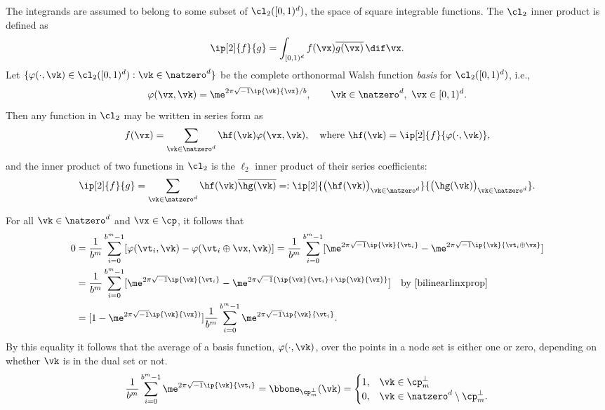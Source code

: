 \documentclass[]{elsarticle}
\theoremstyle{definition}
\newcommand{\cube}{[0,1)^d}
\renewcommand{\bbK}{\natzero^d}
\begin{document}
The integrands are assumed to belong to some subset of $\cl_2(\cube)$, the space of square integrable functions.  The $\cl_2$ inner product is defined as 
\[
\ip[2]{f}{g} = \int_{\cube} f(\vx) \overline{g(\vx)} \, \dif \vx.
\]
Let $\{\varphi(\cdot,\vk) \in \cl_2(\cube) : \vk \in \bbK\}$ be the complete orthonormal Walsh function \emph{basis} for $\cl_2(\cube)$, i.e., 
\[
\varphi(\vx,\vk)  = \me^{2 \pi \sqrt{-1} \ip{\vk}{\vx}/b}, \qquad \vk \in \bbK, \ \vx \in \cube.
\]
Then any function in $\cl_2$ may be written in series form as
\begin{equation} \label{Fourierdef}
f(\vx) = \sum_{\vk \in \bbK} \hf(\vk) \varphi(\vx,\vk), \quad \text{where } \hf(\vk) = \ip[2]{f}{\varphi(\cdot,\vk)},
\end{equation}
and the inner product of two functions in $\cl_2$ is the $\ell_2$ inner product of their series coefficients:
\[
\ip[2]{f}{g} = \sum_{\vk \in \bbK} \hf(\vk)\overline{\hg(\vk)} =: \ip[2]{\bigl(\hf(\vk)\bigr)_{\vk \in \bbK}}{\bigl ( \hg(\vk)\bigr )_{\vk \in \bbK}}.
\]

For all $\vk \in \bbK$ and $\vx \in \cp$, it follows that
\begin{align*} 
\nonumber
0 & = \frac{1}{b^m} \sum_{i=0}^{b^m-1} [\varphi(\vt_i,\vk) - \varphi(\vt_i \oplus \vx,\vk)]  
= \frac{1}{b^m} \sum_{i=0}^{b^m-1} [\me^{2 \pi \sqrt{-1} \ip{\vk}{\vt_i}} - \me^{2 \pi \sqrt{-1} \ip{\vk}{\vt_i \oplus \vx}}]\\
\nonumber
& = \frac{1}{b^m} \sum_{i=0}^{b^m-1} [\me^{2 \pi \sqrt{-1} \ip{\vk}{\vt_i}} - \me^{2 \pi \sqrt{-1} \{\ip{\vk}{\vt_i}+\ip{\vk}{\vx}\}}] \quad \text{by } \eqref{bilinearlinxprop}\\
\label{sumeq}
& = [1 - \me^{2 \pi \sqrt{-1} \ip{\vk}{\vx})}] \frac{1}{b^m} \sum_{i=0}^{b^m-1}  \me^{2 \pi \sqrt{-1} \ip{\vk}{\vt_i}}.
\end{align*}
By this equality it follows that the average of a basis function, $\varphi(\cdot,\vk)$, over the points in a node set is either one or zero, depending on whether $\vk$ is in the dual set or not.
\begin{equation*}
\frac{1}{b^m} \sum_{i=0}^{b^m-1}  \me^{2 \pi \sqrt{-1} \ip{\vk}{\vt_i}} = \bbone_{\cp_m^{\perp}}(\vk) = \begin{cases} 1 , & \vk \in \cp_m^{\perp}\\
 0,  & \vk \in \bbK \setminus \cp_m^{\perp}.
 \end{cases}
\end{equation*}
\end{document}
